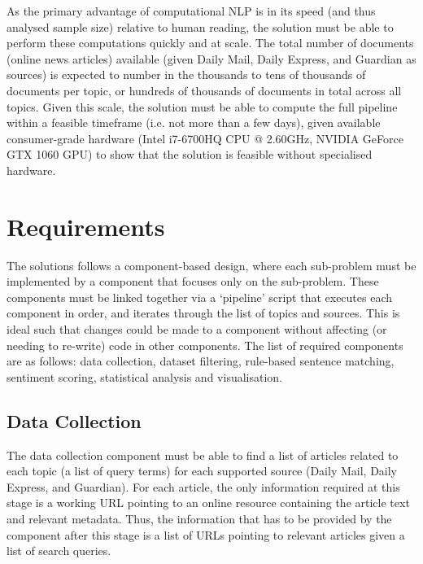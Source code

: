 \documentclass{report}
\begin{document}
As the primary advantage of computational NLP is in its speed (and thus analysed sample size) relative to human reading, the solution must be able to perform these computations quickly and at scale.
The total number of documents (online news articles) available (given Daily Mail, Daily Express, and Guardian as sources) is expected to number in the thousands to tens of thousands of documents per topic, or hundreds of thousands of documents in total across all topics.
Given this scale, the solution must be able to compute the full pipeline within a feasible timeframe (i.e. not more than a few days), given available consumer-grade hardware (Intel i7-6700HQ CPU @ 2.60GHz, NVIDIA GeForce GTX 1060 GPU) to show that the solution is feasible without specialised hardware.

\section{Requirements} \label{Requirements}

The solutions follows a component-based design, where each sub-problem must be implemented by a component that focuses only on the sub-problem.
These components must be linked together via a `pipeline' script that executes each component in order, and iterates through the list of topics and sources.
This is ideal such that changes could be made to a component without affecting (or needing to re-write) code in other components.
The list of required components are as follows: data collection, dataset filtering, rule-based sentence matching, sentiment scoring, statistical analysis and visualisation.


\subsection{Data Collection} \label{req-data-collection}  %

The data collection component must be able to find a list of articles related to each topic (a list of query terms) for each supported source (Daily Mail, Daily Express, and Guardian).
For each article, the only information required at this stage is a working URL pointing to an online resource containing the article text and relevant metadata.
Thus, the information that has to be provided by the component after this stage is a list of URLs pointing to relevant articles given a list of search queries.
\end{document}
